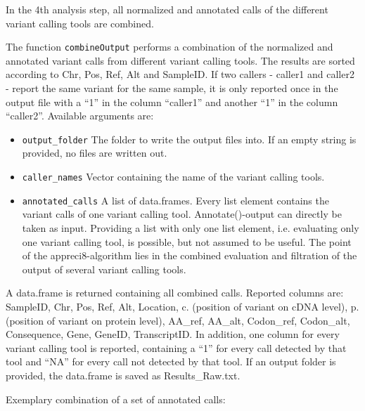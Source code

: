 \documentclass{article}
\begin{document}
In the 4th analysis step, all normalized and annotated calls of the different variant calling tools are combined.

The function \texttt{combineOutput} performs a combination of the normalized and annotated variant calls from different variant calling tools. The results are sorted according to Chr, Pos, Ref, Alt and SampleID. If two callers - caller1 and caller2 - report the same variant for the same sample, it is only reported once in the output file with a ``1'' in the column ``caller1'' and another ``1'' in the column ``caller2''. Available arguments are:

\begin{itemize}
  \item \texttt{output\_folder} The folder to write the output files into. If an empty string is provided, no files are written out.
  \item \texttt{caller\_names} Vector containing the name of the variant calling tools.
  \item \texttt{annotated\_calls} A list of data.frames. Every list element contains the variant calls of one variant calling tool. Annotate()-output can directly be taken as input. Providing a list with only one list element, i.e. evaluating only one variant calling tool, is possible, but not assumed to be useful. The point of the appreci8-algorithm lies in the combined evaluation and filtration of the output of several variant calling tools.
\end{itemize}

A data.frame is returned containing all combined calls. Reported columns are: SampleID, Chr, Pos, Ref, Alt, Location, c. (position of variant on cDNA level), p. (position of variant on protein level), AA\_ref, AA\_alt, Codon\_ref, Codon\_alt, Consequence, Gene, GeneID, TranscriptID. In addition, one column for every variant calling tool is reported, containing a ``1'' for every call detected by that tool and ``NA'' for every call not detected by that tool. If an output folder is provided, the data.frame is saved as Results\_Raw.txt.

Exemplary combination of a set of annotated calls:
\end{document}
